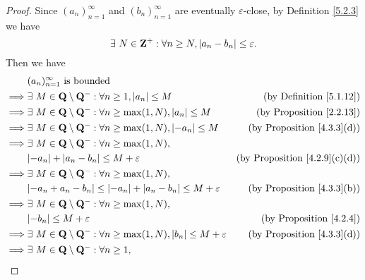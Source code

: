 \begin{proof}
    Since \((a_n)_{n = 1}^{\infty}\) and \((b_n)_{n = 1}^{\infty}\) are eventually \(\varepsilon\)-close, by Definition \ref{5.2.3} we have
    \[
        \exists\ N \in \mathbf{Z}^+ : \forall n \geq N, \left\lvert a_n - b_n\right\rvert \leq \varepsilon.
    \]
    Then we have
    \begin{align*}
                 & (a_n)_{n = 1}^\infty \text{ is bounded}                                                                                                  \\
        \implies & \exists\ M \in \Q \setminus \Q^- : \forall n \geq 1, \abs{a_n} \leq M                        & \text{(by Definition \ref{5.1.12})}       \\
        \implies & \exists\ M \in \Q \setminus \Q^- : \forall n \geq \max(1, N), \abs{a_n} \leq M               & \text{(by Proposition \ref{2.2.13})}      \\
        \implies & \exists\ M \in \Q \setminus \Q^- : \forall n \geq \max(1, N), \abs{-a_n} \leq M              & \text{(by Proposition \ref{4.3.3}(d))}    \\
        \implies & \exists\ M \in \Q \setminus \Q^- : \forall n \geq \max(1, N),                                                                            \\
                 & \abs{-a_n} + \abs{a_n - b_n} \leq M + \varepsilon                                            & \text{(by Proposition \ref{4.2.9}(c)(d))} \\
        \implies & \exists\ M \in \Q \setminus \Q^- : \forall n \geq \max(1, N),                                                                            \\
                 & \abs{-a_n + a_n - b_n} \leq \abs{-a_n} + \abs{a_n - b_n} \leq M + \varepsilon                & \text{(by Proposition \ref{4.3.3}(b))}    \\
        \implies & \exists\ M \in \Q \setminus \Q^- : \forall n \geq \max(1, N),                                                                            \\
                 & \abs{-b_n} \leq M + \varepsilon                                                              & \text{(by Proposition \ref{4.2.4})}       \\
        \implies & \exists\ M \in \Q \setminus \Q^- : \forall n \geq \max(1, N), \abs{b_n} \leq M + \varepsilon & \text{(by Proposition \ref{4.3.3}(d))}    \\
        \implies & \exists\ M \in \Q \setminus \Q^- : \forall n \geq 1,                                                                                     \\

\end{align*}
\end{proof}

